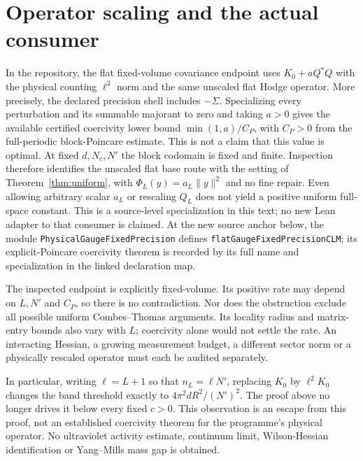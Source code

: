 \documentclass[11pt]{article}
\begin{document}
\section{Operator scaling and the actual consumer}
In the repository, the flat fixed-volume covariance endpoint uses
$K_0+aQ^*Q$ with the physical counting $\ell^2$ norm and the same unscaled
flat Hodge operator. More precisely, the declared precision shell includes
$-\Sigma$. Specializing every perturbation and its summable majorant to zero
and taking $a>0$ gives the available certified coercivity lower bound
$\min(1,a)/C_P$, with $C_P>0$ from the full-periodic block-Poincare estimate.
This is not a claim that this value is optimal. At fixed $d,N_c,N'$ the block
codomain is fixed and finite. Inspection therefore identifies the unscaled
flat base route with the setting of Theorem~\ref{thm:uniform}, with
$\Phi_L(y)=a_L\|y\|^2$ and no fine repair. Even allowing arbitrary scalar
$a_L$ or rescaling $Q_L$ does not yield a positive uniform full-space constant.
This is a source-level specialization in this text; no new Lean adapter to
that consumer is claimed. At the new source anchor below, the module
\texttt{PhysicalGaugeFixedPrecision} defines
\texttt{flatGaugeFixedPrecisionCLM}; its explicit-Poincare coercivity theorem
is recorded by its full name and specialization in the linked declaration map.

The inspected endpoint is explicitly fixed-volume. Its positive rate may
depend on $L,N'$ and $C_P$, so there is no contradiction. Nor does the
obstruction exclude all possible uniform Combes--Thomas arguments. Its
locality radius and matrix-entry bounds also vary with $L$; coercivity alone
would not settle the rate. An interacting Hessian, a growing measurement
budget, a different sector norm or a physically rescaled operator must each
be audited separately.

In particular, writing $\ell=L+1$ so that $n_L=\ell N'$, replacing $K_0$
by $\ell^2K_0$ changes the band threshold exactly to
$4\pi^2dR^2/(N')^2$. The proof above
no longer drives it below every fixed $c>0$. This observation is an escape
from this proof, not an established coercivity theorem for the programme's
physical operator. No ultraviolet activity estimate, continuum limit,
Wilson-Hessian identification or Yang--Mills mass gap is obtained.
\end{document}
